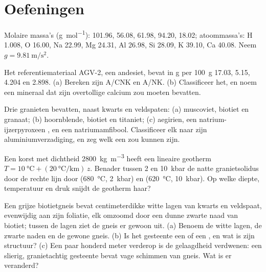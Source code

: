 \section{Oefeningen}\label{sec:b2:crustal-melting:exercises}

Molaire massa's (\unit{\gram\per\mole}):  101.96,  56.08,  61.98,
 94.20,  18.02; atoommassa's: H 1.008, O 16.00, Na 22.99, Mg 24.31,
Al 26.98, Si 28.09, K 39.10, Ca 40.08. Neem $g = \qty{9.81}{\metre\per\second\squared}$.

\begin{exercise}[$\star$]\label{exo:b2:crustal-melting:1}
Het referentiemateriaal AGV-2, een andesiet, bevat in \unit{\gram} per \qty{100}{\gram}
 17.03,  5.15,  4.204 en  2.898.
(a) Bereken zijn A/CNK en A/NK. (b) Classificeer het, en noem een mineraal dat zijn
overtollige calcium zou moeten bevatten.
\end{exercise}

\begin{exercise}[$\star$]\label{exo:b2:crustal-melting:2}
Drie granieten bevatten, naast kwarts en veldspaten: (a) muscoviet, biotiet en granaat;
(b) hoornblende, biotiet en titaniet; (c) aegirien, een natrium-ijzerpyroxeen
, en een natriumamfibool. Classificeer elk naar zijn aluminiumverzadiging, en zeg
welk een  zou kunnen zijn.
\end{exercise}

\begin{exercise}[$\star$]\label{exo:b2:crustal-melting:3}
Een korst met dichtheid \qty{2800}{\kilogram\per\cubic\metre} heeft een lineaire geotherm
$T = \qty{10}{\celsius} + (\qty{20}{\celsius\per\kilo\metre})\,z$. Benader tussen 2 en
\qty{10}{kbar} de natte granietsolidus door de rechte lijn door
(\qty{680}{\celsius}, \qty{2}{kbar}) en (\qty{620}{\celsius}, \qty{10}{kbar}). Op welke
diepte, temperatuur en druk snijdt de geotherm haar?
\end{exercise}

\begin{exercise}[$\star$]\label{exo:b2:crustal-melting:4}
Een grijze biotietgneis bevat centimeterdikke witte lagen van kwarts en veldspaat, evenwijdig
aan zijn foliatie, elk omzoomd door een dunne zwarte naad van biotiet; tussen de lagen ziet de
gneis er gewoon uit. (a) Benoem de witte lagen, de zwarte naden en de gewone gneis.
(b) Is het gesteente een  of een , en wat is zijn structuur? (c) Een paar honderd
meter verderop is de gelaagdheid verdwenen: een slierig, granietachtig gesteente bevat vage schimmen van
gneis. Wat is er veranderd?
\end{exercise}


